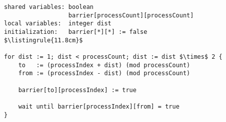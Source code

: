 \begin{minipage}
\centering
\begin{lstlisting}[mathescape, linewidth=11.8cm]
shared variables: boolean
                  barrier[processCount][processCount]
local variables:  integer dist
initialization:   barrier[*][*] := false
$\listingrule{11.8cm}$

for dist := 1; dist < processCount; dist := dist $\times$ 2 {
	to   := (processIndex + dist) (mod processCount)
	from := (processIndex - dist) (mod processCount)
	
	barrier[to][processIndex] := true
	
	wait until barrier[processIndex][from] = true
}
\end{lstlisting}
\end{minipage}

